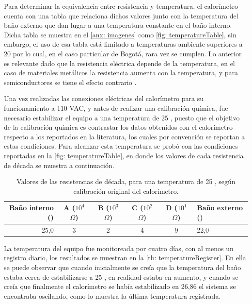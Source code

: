 	Para determinar la equivalencia entre resistencia y temperatura, el calorímetro cuenta con una tabla que relaciona dichos valores junto con la temperatura del ba\~no externo que dan lugar a una temperatura constante en el ba\~no interno. Dicha tabla se muestra en el \autoref{anx: imagenes} como \autoref{fig: temperatureTable}, sin embargo, el uso de esa tabla est\'a limitado a temperaturas ambiente superiores a 20 \grad{} por lo cual, en el caso particular de Bogot\'a, rara vez se cumplen. Lo anterior es relevante dado que la resistencia el\'ectrica depende de la temperatura, en el caso de materiales met\'alicos la resistencia aumenta con la temperatura, y para semiconductores se tiene el efecto contrario \cite{simon2013oxford}.
	
	Una vez realizadas las conexiones el\'ectricas del calor\'imetro para su funcionamiento a 110 VAC, y antes de realizar una calibraci\'on qu\'imica, fue necesario estabilizar el equipo a una temperatura de 25 \grad{}, puesto que el objetivo de la calibraci\'on qu\'imica es contrastar los datos obtenidos con el calor\'imetro respecto a los reportados en la literatura, los cuales por convenci\'on se reportan a estas condiciones. Para alcanzar esta temperatura se probó con las condiciones reportadas en la \autoref{fig: temperatureTable}, en donde los valores de cada resistencia de década se muestra a continuación. 
	\begin{table}[h]
		\centering
		\caption{Valores de las resistencias de década, para una temperatura de 25 \grad{}, seg\'un calibración original del calorímetro.}
		\begin{tabular}{r|cccc|l}
			\hline
			\textbf{Baño interno (\grad{})} & A ($10^4$ $\Omega$) & B ($10^3$ $\Omega$) & C ($10^2$ $\Omega$) & D ($10^1$ $\Omega$) & \textbf{Baño externo (\grad{})} \\
			\hline
			25,0 & 3 & 2 & 4 & 9 & 22,0 \\
			\hline
		\end{tabular}
		\label{tb: decadeResistorsBefore}
	\end{table}
	
	La temperatura del equipo fue monitoreada por cuatro días, con al menos un registro diario, los resultados se muestran en la \autoref{tb: temperatureRegister}. En ella se puede observar que cuando inicialmente se creía que la temperatura del baño estaba cerca de estabilizarse a 25 \grad{}, en realidad estaba en aumento, y cuando se creía que finalmente el calorímetro se había estabilizado en 26,86 \grad{} el sistema se encontraba oscilando, como lo muestra la última temperatura registrada.
	
